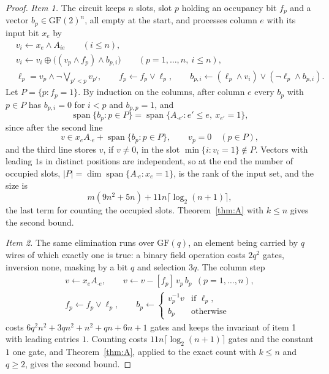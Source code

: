 \documentclass[11pt]{article}
\begin{document}
\begin{proof}
\emph{Item 1.}  The circuit keeps $n$ slots, slot $p$ holding an occupancy bit
$f_p$ and a vector $b_p\in\mathrm{GF}(2)^{n}$, all empty at the start, and
processes column $e$ with its input bit $x_e$ by
\begin{align*}
  &v_i\leftarrow x_e\wedge A_{ie}\qquad(i\le n),\\
  &v_i\leftarrow v_i\oplus\bigl((v_p\wedge f_p)\wedge b_{p,i}\bigr)\qquad(p=1,\ldots,n,\ i\le n),\\
  &\ell_p=v_p\wedge\neg\textstyle\bigvee_{p'<p}v_{p'},\qquad f_p\leftarrow f_p\vee\ell_p,\qquad
   b_{p,i}\leftarrow(\ell_p\wedge v_i)\vee(\neg\ell_p\wedge b_{p,i}).
\end{align*}
Let $P=\{p:f_p=1\}$.  By induction on the columns, after column $e$ every $b_p$ with
$p\in P$ has $b_{p,i}=0$ for $i<p$ and $b_{p,p}=1$, and
\[
  \operatorname{span}\{b_p:p\in P\}=\operatorname{span}\{A_{\cdot e'}:e'\le e,\ x_{e'}=1\},
\]
since after the second line
\[
  v\in x_eA_{\cdot e}+\operatorname{span}\{b_p:p\in P\},\qquad v_p=0\quad(p\in P),
\]
and the third line stores $v$, if $v\ne0$, in the slot $\min\{i:v_i=1\}\notin P$.
Vectors with leading $1$s in distinct positions are independent, so at the end
the number of occupied slots, $|P|=\dim\operatorname{span}\{A_{\cdot e}:x_e=1\}$, is
the rank of the input set, and the size is
\[
  m(9n^{2}+5n)+11n\lceil\log_2(n+1)\rceil,
\]
the last term for counting the occupied slots.  Theorem~\ref{thm:A} with $k\le n$
gives the second bound.

\emph{Item 2.}  The same elimination runs over $\mathrm{GF}(q)$, an element
being carried by $q$ wires of which exactly one is true: a binary field operation
costs $2q^{2}$ gates, inversion none, masking by a bit $q$ and selection $3q$.
The column step
\[
  \begin{gathered}
  v\leftarrow x_eA_{\cdot e},\qquad v\leftarrow v-[f_p]\,v_p\,b_p\ \ (p=1,\ldots,n),\\
  f_p\leftarrow f_p\vee\ell_p,\qquad
  b_p\leftarrow\begin{cases}v_p^{-1}v&\text{if }\ell_p,\\b_p&\text{otherwise}\end{cases}
  \end{gathered}
\]
costs $6q^{2}n^{2}+3qn^{2}+n^{2}+qn+6n+1$ gates and keeps the invariant of item 1
with leading entries $1$.  Counting costs $11n\lceil\log_2(n+1)\rceil$ gates and
the constant $1$ one gate, and Theorem~\ref{thm:A}, applied to the exact count with
$k\le n$ and $q\ge2$, gives the second bound.


\end{proof}
\end{document}
